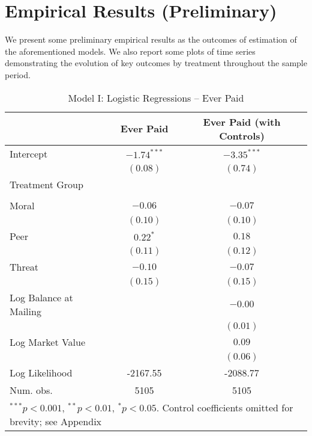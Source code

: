 \documentclass[12pt,titlepage]{article}
\begin{document}
\newpage


\section{Empirical Results (Preliminary) }

We present some preliminary empirical results as the outcomes of
estimation of the aforementioned models. We also report some plots of time series
demonstrating the evolution of key outcomes by treatment throughout the sample
period.


\begin{table}[htbp]
\caption{Model I: Logistic Regressions -- Ever Paid} \label{table:modelI}
\begin{center}
\begin{tabular}{l c c }
\hline
                       & Ever Paid & Ever Paid (with Controls) \\
\hline
Intercept              & $-1.74^{***}$ & $-3.35^{***}$ \\
                       & $(0.08)$      & $(0.74)$      \\
Treatment Group        &               &               \\
                       &               &               \\
\quad Moral            & $-0.06$       & $-0.07$       \\
                       & $(0.10)$      & $(0.10)$      \\
\quad Peer             & $0.22^{*}$        & $0.18$        \\
                       & $(0.11)$      & $(0.12)$      \\
\quad Threat           & $-0.10$       & $-0.07$       \\
                       & $(0.15)$      & $(0.15)$      \\
Log Balance at Mailing &               & $-0.00$       \\
                       &               & $(0.01)$      \\
Log Market Value       &               & $0.09$        \\
                       &               & $(0.06)$      \\
\hline
Log Likelihood         & -2167.55      & -2088.77      \\
Num. obs.              & 5105          & 5105          \\
\hline
\multicolumn{3}{l}{\scriptsize{$^{***}p<0.001$, $^{**}p<0.01$, $^*p<0.05$. Control coefficients omitted for brevity; see Appendix}}
\end{tabular}
\end{center}
\end{table}
\end{document}
